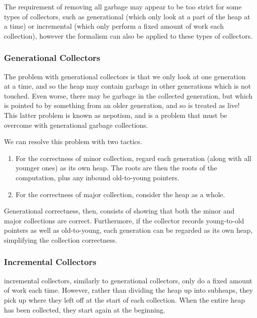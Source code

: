 The requirement of removing all \gls{garbage} may appear to be too
strict for some types of collectors, such as generational (which only
look at a part of the heap at a time) or incremental (which only
perform a fixed amount of work each collection), however the formalism
can also be applied to these types of collectors.

\subsubsection{Generational Collectors}

The problem with generational collectors is that we only look at one
generation at a time, and so the heap may contain garbage in other
generations which is not touched. Even worse, there may be
\gls{garbage} in the collected generation, but which is pointed to by
something from an older generation, and so is treated as live! This
latter problem is known as \gls{nepotism}, and is a problem that must
be overcome with \glspl{generational garbage collection}.

We can resolve this problem with two tactics.

\begin{enumerate}
  \item For the correctness of minor collection, regard each
    generation (along with all younger ones) as its own
    \gls{heap}. The \glspl{root} are then the \glspl{root} of the
    computation, plus any inbound \glspl{old-to-young pointer}.

  \item For the correctness of major collection, consider the
    \gls{heap} as a whole.
\end{enumerate}

Generational correctness, then, consists of showing that both the
minor and major collections are correct. Furthermore, if the collector
records young-to-old pointers as well as old-to-young, each generation
can be regarded as its own heap, simplifying the collection correctness.

\subsubsection{Incremental Collectors}

\Glspl{incremental collector}, similarly to generational collectors, only do
a fixed amount of work each time. However, rather than dividing the
heap up into subheaps, they pick up where they left off at the start
of each collection. When the entire heap has been collected, they
start again at the beginning.

